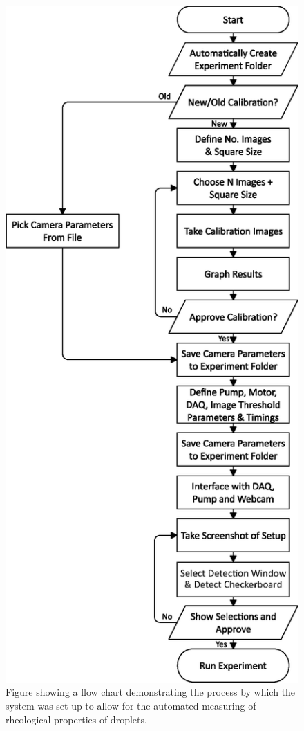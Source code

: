 \documentclass{physics_article_B}
\begin{document}
            \newpage
            \begin{figure}[H]
                \centering
                \hspace*{-5.4cm}\includegraphics[scale=0.8]{Figures/FlowSetup.eps}
                \caption{Figure showing a flow chart demonstrating the process by which the system was set up to allow for the automated measuring of rheological properties of droplets.}
                \label{fig:setup:flow}
            \end{figure}
            
\end{document}
